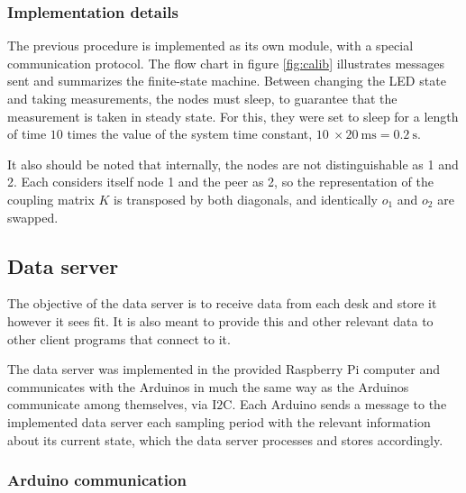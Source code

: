 \documentclass[english,fira]{ist-report}
\begin{document}
\subsubsection{Implementation details}

The previous procedure is implemented as its own module, with a special communication protocol. The flow chart in figure \ref{fig:calib} illustrates messages sent and summarizes the finite-state machine.
Between changing the LED state and taking measurements, the nodes must sleep, to guarantee that the measurement is taken in steady state. For this, they were set to sleep for a length of time $10$ times the value of the system time constant, $\SI{10}{} \times \SI{20}{\milli \second} = \SI{0.2}{\second}$. 

It also should be noted that internally, the nodes are not distinguishable as 1 and 2. Each considers itself node 1 and the peer as 2, so the representation of the coupling matrix $K$ is transposed by both diagonals, and identically $o_1$ and $o_2$ are swapped.

\subsection{Data server}

The objective of the data server is to receive data from each desk and store it however it sees fit. It is also meant to provide this and other relevant data to other client programs that connect to it.

The data server was implemented in the provided Raspberry Pi computer and communicates with the Arduinos in much the same way as the Arduinos communicate among themselves, via I$2$C. Each Arduino sends a message to the implemented data server each sampling period with the relevant information about its current state, which the data server processes and stores accordingly.

\subsubsection{Arduino communication}
\end{document}
